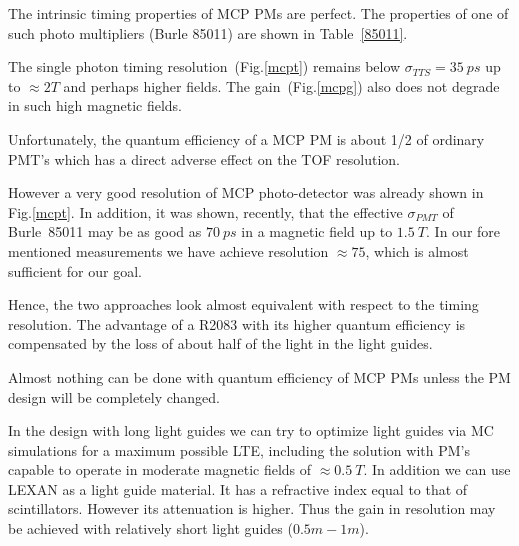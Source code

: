 The intrinsic timing properties of MCP PMs are perfect.
The properties of one 
 of such photo multipliers (Burle 85011) are shown in  Table~\ref{85011}.
  
The single photon timing resolution~(Fig.\ref{mcpt}) 
remains  below  $\sigma_{TTS}=35~ps$ up to $\approx 2T$ and perhaps 
higher fields. The gain~(Fig.\ref{mcpg}) also does not degrade 
in such high  magnetic fields\cite{kich}.

Unfortunately, the quantum efficiency 
of a MCP PM is about 1/2  of ordinary PMT's
which has  a direct adverse effect on the TOF resolution.

However
a very good resolution of MCP  photo-detector 
was already shown in Fig.\ref{mcpt}.
In addition, it was shown\cite{vavra}, recently, 
that the effective $\sigma_{PMT}$ of Burle~85011 may be as good as  $70~ps$
in a magnetic field up to $1.5~T$. In our fore mentioned 
measurements we have   achieve resolution $\approx75$, which is almost 
sufficient for our goal.  


Hence, the two  approaches look  almost 
equivalent with respect to  the timing resolution. 
The advantage of a R2083 with its higher quantum efficiency is compensated by the loss of about  
half of the light in the light guides.
 
Almost nothing 
can be done with  quantum efficiency of MCP PMs unless the PM design 
will be completely changed.

In the  design with long light guides  we can  try to  
optimize light guides via MC simulations for a maximum possible LTE,
 including
the solution with PM's capable to operate in  moderate magnetic 
fields of $\approx0.5~T$.
In addition we can use LEXAN as a light guide material. It has a 
refractive index equal to that of scintillators. 
However its attenuation is higher. 
Thus the gain in resolution may be achieved with relatively short light guides
($0.5m-1m$).

